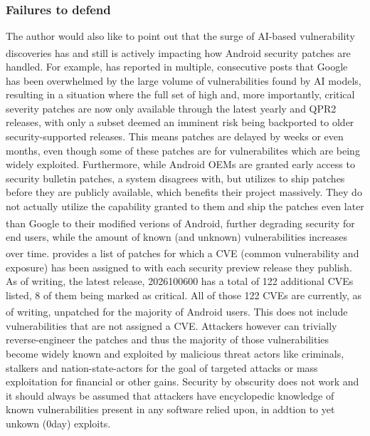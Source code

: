 \documentclass[a4paper,12pt]{report}
\begin{document}
\subsubsection{Failures to defend}
\label{google-failure}
The author would also like to point out that the surge of AI-based vulnerability discoveries has and still is actively impacting how Android\texttrademark \textsuperscript{\citep{android-tm}} security patches are handled. For example, \citeauthor{grapheneos} has reported in multiple, consecutive posts that Google has been overwhelmed by the large volume of vulnerabilities found by AI models, resulting in a situation where the full set of high and, more importantly, critical severity patches are now only available through the latest yearly and QPR2 releases, with only a subset deemed an imminent risk being backported to older security-supported releases. This means patches are delayed by weeks or even months, even though some of these patches are for vulnerabilites which are being widely exploited.
Furthermore, while Android OEMs are granted early access to security bulletin patches, a system \citeauthor{grapheneos} disagrees with, but utilizes to ship patches before they are publicly available, which benefits their project massively. They do not actually utilize the capability granted to them and ship the patches even later than Google to their modified verions of Android\texttrademark \textsuperscript{\citep{android-tm}}, further degrading security for end users, while the amount of known (and unknown) vulnerabilities increases over time.\textsuperscript{\citep{grapheneos1,grapheneos2,grapheneos3}}
\citeauthor{grapheneos} provides a list of patches for which a CVE (common vulnerability and exposure) has been assigned to with each security preview release they publish. As of writing, the latest release, 2026100600 has a total of 122 additional CVEs listed, 8 of them being marked as critical. All of those 122 CVEs are currently, as of writing, unpatched for the majority of Android\texttrademark \textsuperscript{\citep{android-tm}} users. This does not include vulnerabilities that are not assigned a CVE.
Attackers however can trivially reverse-engineer the patches and thus the majority of those vulnerabilities become widely known and exploited by malicious threat actors like criminals, stalkers and nation-state-actors for the goal of targeted attacks or mass exploitation for financial or other gains. Security by obscurity does not work and it should always be assumed that attackers have encyclopedic knowledge of known vulnerabilities present in any software relied upon, in addtion to yet unkown (0day) exploits.
\end{document}
